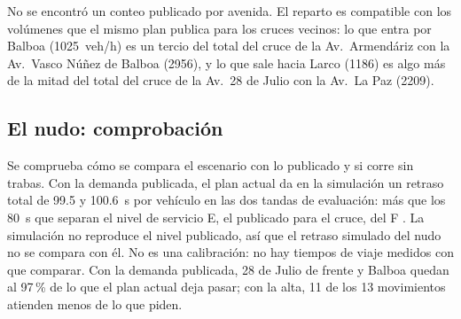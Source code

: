 \begin{table}[!tbp]
\centering
\footnotesize

\caption[Caso Lima, el nudo: demanda por entrada y destino]{Caso Lima, el nudo: demanda publicada en la hora punta de la tarde (veh/h), por entrada y destino. El total es el publicado; el reparto es un supuesto. Por redondeo, las sumas pueden diferir en 1.}
\label{tab:lima-demanda}
\end{table}

No se encontró un conteo publicado por avenida. El reparto es
compatible con los volúmenes que el mismo plan publica para los cruces
vecinos: lo que entra por Balboa (1025~veh/h) es un tercio del total del
cruce de la Av.~Armendáriz con la Av.~Vasco Núñez de Balboa (2956), y lo
que sale hacia Larco (1186) es algo más de la mitad del total del cruce
de la Av.~28 de Julio con la Av.~La Paz (2209).

\subsection*{El nudo: comprobación}

Se comprueba cómo se compara el escenario con lo publicado y si corre
sin trabas. Con la demanda publicada, el plan
actual da en la simulación un retraso total de 99.5 y 100.6~s por
vehículo en las dos tandas de evaluación: más que los 80~s que separan
el nivel de servicio E, el publicado para el cruce, del F
\citep{HCM2000_or_2010}. La simulación no reproduce el nivel publicado,
así que el retraso simulado del nudo no se compara con él. No es una
calibración: no hay tiempos de viaje medidos con que comparar. Con la
demanda publicada, 28 de Julio de frente y Balboa quedan al 97\,\% de lo
que el plan actual deja pasar; con la alta, 11 de los 13 movimientos
atienden menos de lo que piden.

